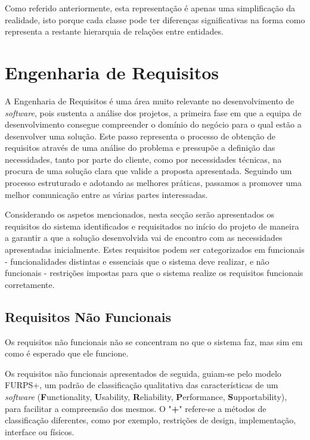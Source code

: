 Como referido anteriormente, esta representação é apenas uma simplificação da realidade, isto
porque cada classe pode ter diferenças significativas na forma como representa a restante
hierarquia de relações entre entidades.

\section{Engenharia de Requisitos}

A Engenharia de Requisitos é uma área muito relevante no desenvolvimento de \textit{software}, pois 
sustenta a análise dos projetos, a primeira fase em que a equipa de desenvolvimento consegue 
compreender o domínio do negócio para o qual estão a desenvolver uma solução. Este passo representa 
o processo de obtenção de requisitos através de uma análise do problema e pressupõe a definição 
das necessidades, tanto por parte do cliente, como por necessidades técnicas, na procura de uma 
solução clara que valide a proposta apresentada. Seguindo um processo estruturado e adotando as 
melhores práticas, passamos a promover uma melhor comunicação entre as várias partes interessadas.

Considerando os aspetos mencionados, nesta secção serão apresentados os requisitos do sistema 
identificados e requisitados no início do projeto de maneira a garantir a que a solução desenvolvida 
vai de encontro com as necessidades apresentadas inicialmente. Estes requisitos podem ser 
categorizados em funcionais - funcionalidades distintas e essenciais que o sistema deve realizar, 
e não funcionais - restrições impostas para que o sistema realize os requisitos funcionais 
corretamente.

\subsection{Requisitos Não Funcionais}

Os requisitos não funcionais não se concentram no que o sistema faz, mas sim em como é esperado que
ele funcione. 

Os requisitos não funcionais apresentados de seguida, guiam-se pelo modelo FURPS+, um padrão de 
classificação qualitativa das características de um \textit{software} (\textbf{F}unctionality, 
\textbf{U}sability, \textbf{R}eliability, \textbf{P}erformance, \textbf{S}upportability), para 
facilitar a compreensão dos mesmos. O "\textbf{+}" refere-se a métodos de classificação diferentes, 
como por exemplo, restrições de design, implementação, interface ou físicos.

